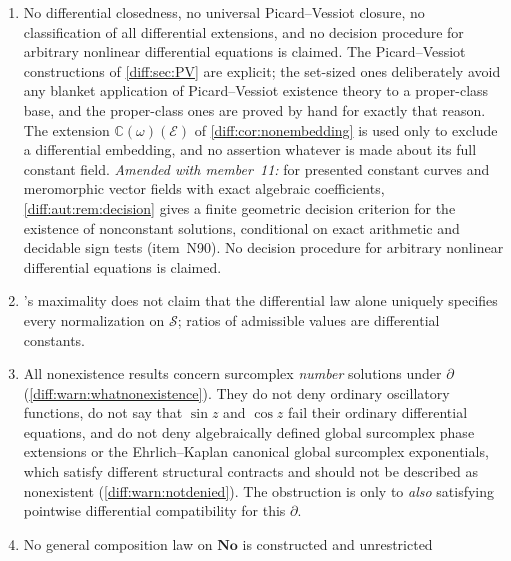 \documentclass[11pt,letterpaper]{article}
\numberwithin{equation}{section}
\theoremstyle{definition}
\theoremstyle{remark}
\newcommand{\No}{\mathbf{No}}
\newcommand{\R}{\mathbb R}
\newcommand{\C}{\mathbb C}
\newcommand{\der}{\partial}
\newcommand{\Imm}{\operatorname{Im}}
\newcommand{\Strip}{\mathcal S}
\newcommand{\GL}{\operatorname{GL}}
\newcommand{\Ph}{\operatorname{Ph}}
\newcommand{\KR}{K_{\R}}
\begin{document}
\begin{enumerate}[label=\textup{N\arabic*.},leftmargin=3.0em,itemsep=0.35em,start=21]
For power-Hahn regular-singular systems, $\Ph(-tA)=\{(\Imm\lambda_j)\log t\}$,
with the $\lambda_j$ the eigenvalues of the ordinary residual matrix. The
normalizing gauge is explicit and lies in $\GL_n(\KR[\log t])$
(\cref{diff:rs:prop:phasespectrum}); within this class the module splits into
rank-one factors with obstructions read off from that matrix
(\cref{diff:rs:rem:effective}).  lies outside the
class. Explicit computation for broader input languages remains open.
\item No differential closedness, no universal Picard--Vessiot closure, no
classification of all differential extensions, and no decision procedure for
arbitrary nonlinear differential equations is claimed. The Picard--Vessiot
constructions of \cref{diff:sec:PV} are explicit; the set-sized ones
deliberately avoid any blanket application of Picard--Vessiot existence theory
to a proper-class base, and the proper-class ones are proved by hand for
exactly that reason. The extension $\C(\omega)(\mathcal E)$ of
\cref{diff:cor:nonembedding} is used only to exclude a differential embedding,
and no assertion whatever is made about its full constant field.
\emph{Amended with member~11:} for presented constant curves and meromorphic
vector fields with exact algebraic coefficients, \cref{diff:aut:rem:decision}
gives a finite geometric decision criterion for the existence of nonconstant
solutions, conditional on exact arithmetic and decidable sign tests
(item~N90). No decision procedure for arbitrary nonlinear differential equations
is claimed.
\item {}'s maximality does not claim that the
differential law alone uniquely specifies every normalization on $\Strip$;
ratios of admissible values are differential constants.
\item All nonexistence results concern surcomplex \emph{number} solutions
under $\der$ (\cref{diff:warn:whatnonexistence}). They do not deny ordinary
oscillatory functions, do not say that $\sin z$ and $\cos z$ fail their
ordinary differential equations, and do not deny algebraically defined global
surcomplex phase extensions or the Ehrlich--Kaplan canonical global surcomplex
exponentials, which satisfy different structural contracts and should not be
described as nonexistent (\cref{diff:warn:notdenied}). The obstruction is only
to \emph{also} satisfying pointwise differential compatibility for this
$\der$.
\item No general composition law on $\No$ is constructed and unrestricted

\end{enumerate}
\end{document}
